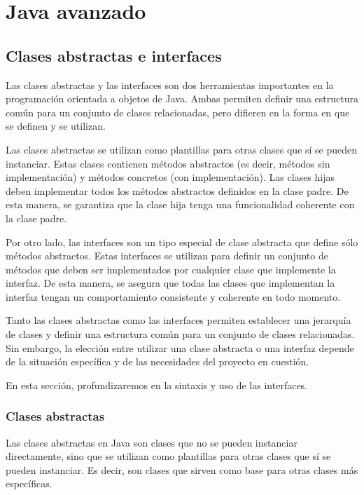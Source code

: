 \documentclass[executivepaper]{article}
\begin{document}
\newpage
\section{Java avanzado}

\subsection{Clases abstractas e interfaces}
Las clases abstractas y las interfaces son dos herramientas importantes en la programación orientada a objetos de Java. Ambas permiten definir una estructura común para un conjunto de clases relacionadas, pero difieren en la forma en que se definen y se utilizan.

Las clases abstractas se utilizan como plantillas para otras clases que sí se pueden instanciar. Estas clases contienen métodos abstractos (es decir, métodos sin implementación) y métodos concretos (con implementación). Las clases hijas deben implementar todos los métodos abstractos definidos en la clase padre. De esta manera, se garantiza que la clase hija tenga una funcionalidad coherente con la clase padre.

Por otro lado, las interfaces son un tipo especial de clase abstracta que define sólo métodos abstractos. Estas interfaces se utilizan para definir un conjunto de métodos que deben ser implementados por cualquier clase que implemente la interfaz. De esta manera, se asegura que todas las clases que implementan la interfaz tengan un comportamiento consistente y coherente en todo momento.

Tanto las clases abstractas como las interfaces permiten establecer una jerarquía de clases y definir una estructura común para un conjunto de clases relacionadas. Sin embargo, la elección entre utilizar una clase abstracta o una interfaz depende de la situación específica y de las necesidades del proyecto en cuestión.

En esta sección, profundizaremos en la sintaxis y uso de las interfaces.

\subsubsection{Clases abstractas}

Las clases abstractas en Java son clases que no se pueden instanciar directamente, sino que se utilizan como plantillas para otras clases que sí se pueden instanciar. Es decir, son clases que sirven como base para otras clases más específicas.
\end{document}
